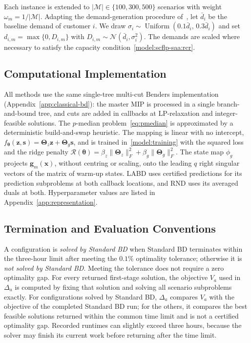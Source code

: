 Each instance is extended to $|\mathcal M|\in\{100,300,500\}$ scenarios with weight $\omega_m=1/|\mathcal M|$. Adapting the demand-generation procedure of~\cite{bodur2017strengthened}, let $\bar d_i$ be the baseline demand of customer $i$. We draw $\sigma_i\sim\operatorname{Uniform}(0.1\bar d_i,\,0.3\bar d_i)$ and set $d_{i,m}=\max\{0,D_{i,m}\}$ with $D_{i,m}\sim\mathcal N(\bar d_i,\sigma_i^2)$. The demands are scaled where necessary to satisfy the capacity condition~\eqref{model:scflp-saa:rcr}.

\subsection{Computational Implementation}\label{app:implementation}

All methods use the same single-tree multi-cut Benders implementation (Appendix~\ref{app:classical-bd}): the master MIP is processed in a single branch-and-bound tree, and cuts are added in callbacks at LP-relaxation and integer-feasible solutions. The $p$-median problem~\eqref{eq:pmedian} is approximated by a deterministic build-and-swap heuristic. The mapping is linear with no intercept, $f_{\boldsymbol\theta}(\mathbf z,\mathbf s)=\boldsymbol\Theta_z\mathbf z+\boldsymbol\Theta_g\mathbf s$, and is trained in~\eqref{model:training} with the squared loss and the ridge penalty $\mathcal R(\boldsymbol\theta)=\beta_z\|\boldsymbol\Theta_z\|_F^2+\beta_g\|\boldsymbol\Theta_g\|_F^2$. The state map $\phi_g$ projects $\mathbf g_m(\mathbf x)$, without centring or scaling, onto the leading $q$ right singular vectors of the matrix of warm-up states. LABD uses certified predictions for its prediction subproblems at both callback locations, and RND uses its averaged duals at both. Hyperparameter values are listed in Appendix~\ref{app:representation}.

\subsection{Termination and Evaluation Conventions}\label{app:conventions}

A configuration is \emph{solved by Standard BD} when Standard BD terminates within the three-hour limit after meeting the $0.1\%$ optimality tolerance; otherwise it is \emph{not solved by Standard BD}. Meeting the tolerance does not require a zero optimality gap. For every returned first-stage solution, the objective $V_a$ used in $\Delta_a$ is computed by fixing that solution and solving all scenario subproblems exactly. For configurations solved by Standard BD, $\Delta_a$ compares $V_a$ with the objective of the completed Standard BD run; for the others, it compares the best feasible solutions returned within the common time limit and is not a certified optimality gap. Recorded runtimes can slightly exceed three hours, because the solver may finish its current work before returning after the time limit.

